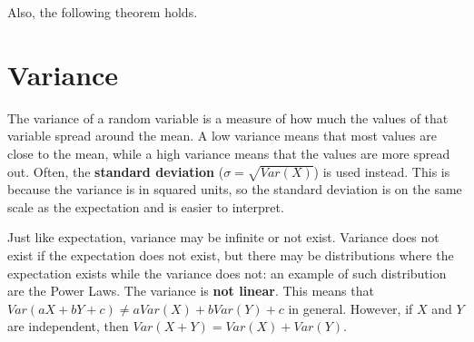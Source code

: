 Also, the following theorem holds.

\section*{Variance}
The variance of a random variable is a measure of how much the values of that variable spread around the mean. A low variance means that most values are close to the mean, while a high variance means that the values are more spread out.
Often, the \textbf{standard deviation} ($\sigma = \sqrt{Var(X)}$) is used instead. This is because the variance is in squared units, so the standard deviation is on the same scale as the expectation and is easier to interpret.

Just like expectation, variance may be infinite or not exist. Variance does not exist if the expectation does not exist, but there may be distributions where the expectation exists while the variance does not: an example of such distribution are the Power Laws.
The variance is \textbf{not linear}. This means that $Var(aX + bY + c) \neq aVar(X) + bVar(Y) + c$ in general. However, if $X$ and $Y$ are independent, then $Var(X + Y) = Var(X) + Var(Y)$.

